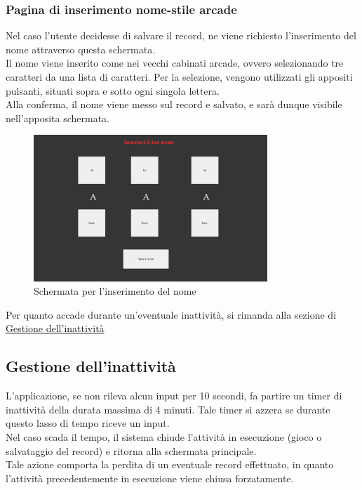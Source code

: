 \subsubsection{Pagina di inserimento nome-stile arcade}
Nel caso l'utente decidesse di salvare il record, ne viene richiesto l'inserimento del nome attraverso questa schermata.\\
Il nome viene inserito come nei vecchi cabinati arcade, ovvero selezionando tre caratteri da una lista di caratteri. Per la selezione, vengono utilizzati gli appositi pulsanti, situati sopra e sotto ogni singola lettera.\\
Alla conferma, il nome viene messo sul record e salvato, e sarà dunque visibile nell'apposita schermata.
\begin{figure}[h]
    \centering
    \includegraphics[width=250pt]{images/product/schermataInserimentoNome.png}
    \caption{Schermata per l'inserimento del nome}
    \label{fig:schermataInserimentoNome}
\end{figure}
Per quanto accade durante un'eventuale inattività, si rimanda alla sezione di \hyperref[sec:inactivity]{Gestione dell'inattività}
\newpage
\subsection{Gestione dell'inattività}
\label{sec:inactivity}
L'applicazione, se non rileva alcun input per 10 secondi, fa partire un timer di inattività della durata massima di 4 minuti. Tale timer si azzera se durante questo lasso di tempo riceve un input.\\
Nel caso scada il tempo, il sistema chiude l'attività in esecuzione (gioco o salvataggio del record) e ritorna alla schermata principale.\\
Tale azione comporta la perdita di un eventuale record effettuato, in quanto l'attività precedentemente in esecuzione viene chiusa forzatamente.